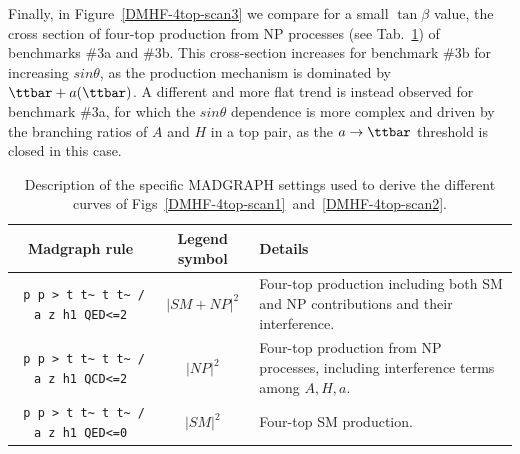 Finally, in Figure~\ref{DMHF-4top-scan3} we compare for a small $\tan\beta$ value, the cross section of four-top production from NP processes (see Tab.~\ref{tab-dmhf-4tops}) of benchmarks \#3a and \#3b. This cross-section increases for benchmark \#3b for increasing $sin\theta$, as the production mechanism is dominated by $\ttbar+a(\ttbar)$. A different and more flat trend is instead observed for benchmark \#3a, for which the $sin\theta$ dependence is more complex and driven by the branching ratios of $A$ and $H$ in a top pair, as the $a\rightarrow \ttbar$ threshold is closed in this case. 

\begin{table}
\begin{tabular}{ccm{50mm}}
\toprule
{\sc Madgraph} rule & Legend symbol & Details \\\midrule
\verb| p p > t t~ t t~ / a z h1 QED<=2|& $|SM+NP|^2$ & Four-top
production including both SM and NP contributions and their
interference. \\\midrule
\verb| p p > t t~ t t~ / a z h1 QCD<=2|& $|NP|^2$ & Four-top
production from NP processes, including interference terms among
$A,H,a$. \\\midrule
\verb| p p > t t~ t t~ / a z h1 QED<=0|& $|SM|^2$ & Four-top SM
production.\\
\bottomrule
\end{tabular}
\caption{Description of the specific MADGRAPH settings used to derive
the different curves of Figs~\ref{DMHF-4top-scan1}~and~\ref{DMHF-4top-scan2}.}
\label{tab-dmhf-4tops}
\end{table}

